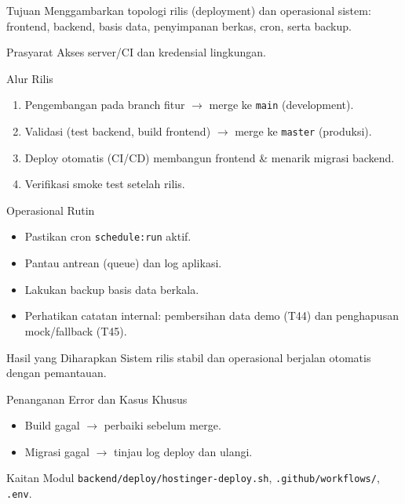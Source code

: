 
\begin{flowsection}{Tujuan}
Menggambarkan topologi rilis (deployment) dan operasional sistem: frontend,
backend, basis data, penyimpanan berkas, cron, serta backup.
\end{flowsection}

\begin{flowsection}{Prasyarat}
Akses server/CI dan kredensial lingkungan.
\end{flowsection}

\begin{flowsection}{Alur Rilis}
\begin{enumerate}
  \item Pengembangan pada branch fitur $\rightarrow$ merge ke \texttt{main} (development).
  \item Validasi (test backend, build frontend) $\rightarrow$ merge ke \texttt{master} (produksi).
  \item Deploy otomatis (CI/CD) membangun frontend \& menarik migrasi backend.
  \item Verifikasi smoke test setelah rilis.
\end{enumerate}
\end{flowsection}


\begin{flowsection}{Operasional Rutin}
\begin{itemize}
  \item Pastikan cron \texttt{schedule:run} aktif.
  \item Pantau antrean (queue) dan log aplikasi.
  \item Lakukan backup basis data berkala.
  \item Perhatikan catatan internal: pembersihan data demo (T44) dan penghapusan mock/fallback (T45).
\end{itemize}
\end{flowsection}

\begin{flowsection}{Hasil yang Diharapkan}
Sistem rilis stabil dan operasional berjalan otomatis dengan pemantauan.
\end{flowsection}

\begin{flowsection}{Penanganan Error dan Kasus Khusus}
\begin{itemize}
  \item Build gagal $\rightarrow$ perbaiki sebelum merge.
  \item Migrasi gagal $\rightarrow$ tinjau log deploy dan ulangi.
\end{itemize}
\end{flowsection}

\begin{flowsection}{Kaitan Modul}
\texttt{backend/deploy/hostinger-deploy.sh}, \texttt{.github/workflows/}, \texttt{.env}.
\end{flowsection}

